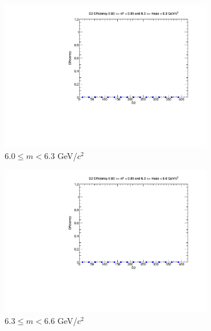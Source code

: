 \documentclass[11pt]{article}
\begin{document}
\begin{figure}[p]
\begin{subfigure}[b]{0.32\textwidth}
        \includegraphics[width=\textwidth]{./kTrackerEfficiencyPlots/D2_Efficiency_xF16_mass6.pdf}
        \caption{$6.0 \leq m < 6.3$ GeV/$c^2$}
    \end{subfigure}\hfill
    \begin{subfigure}[b]{0.32\textwidth}
        \centering
        \includegraphics[width=\textwidth]{./kTrackerEfficiencyPlots/D2_Efficiency_xF16_mass7.pdf}
        \caption{$6.3 \leq m < 6.6$ GeV/$c^2$}
    \end{subfigure}\hfill
    \begin{subfigure}[b]{0.32\textwidth}
        \centering

\end{subfigure}
\end{figure}
\end{document}
